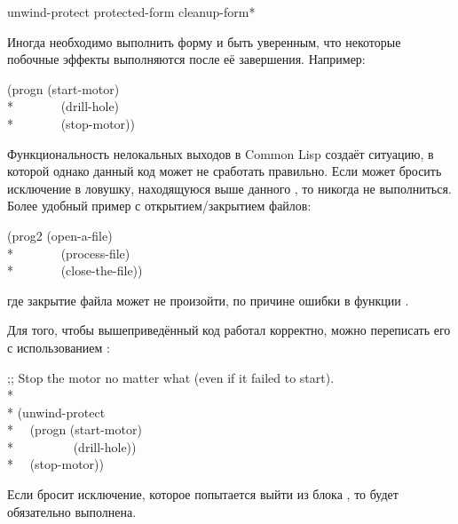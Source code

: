 \begin{defspec}
unwind-protect protected-form {cleanup-form}*

Иногда необходимо выполнить форму и быть уверенным, что некоторые побочные
эффекты выполняются после её завершения.
Например:
\begin{lisp}
(progn (start-motor) \\*
~~~~~~~(drill-hole) \\*
~~~~~~~(stop-motor))
\end{lisp}
Функциональность нелокальных выходов в Common Lisp создаёт ситуацию, в которой
однако данный код может не сработать правильно.
Если  может бросить исключение в ловушку, находящуюся выше
данного , то  никогда не выполниться.
Более удобный пример с открытием/закрытием файлов:
\begin{lisp}
(prog2 (open-a-file) \\*
~~~~~~~(process-file) \\*
~~~~~~~(close-the-file))
\end{lisp}
где закрытие файла может не произойти, по причине ошибки в функции
.

Для того, чтобы вышеприведённый код работал корректно, можно переписать его с
использованием :
\begin{lisp}
;; Stop the motor no matter what (even if it failed to start). \\*
\\*
(unwind-protect \\*
~~(progn (start-motor) \\*
~~~~~~~~~(drill-hole)) \\*
~~(stop-motor))
\end{lisp}
Если  бросит исключение, которое попытается выйти из блока
, то  будет обязательно выполнена.


\end{defspec}
